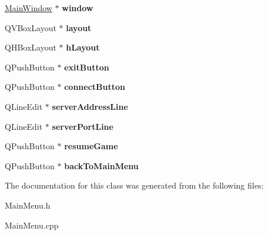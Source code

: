 \begin{DoxyCompactItemize}
\item 
\hypertarget{classMainMenu_abc19dcb3e56979d23cc48e0872022ed7}{
\hyperlink{classMainWindow}{MainWindow} $\ast$ {\bfseries window}}
\label{classMainMenu_abc19dcb3e56979d23cc48e0872022ed7}

\item 
\hypertarget{classMainMenu_a516a5fa867eb244537c9d98b20b953ab}{
QVBoxLayout $\ast$ {\bfseries layout}}
\label{classMainMenu_a516a5fa867eb244537c9d98b20b953ab}

\item 
\hypertarget{classMainMenu_a38c3e8be4f61fa8726abc836ac564531}{
QHBoxLayout $\ast$ {\bfseries hLayout}}
\label{classMainMenu_a38c3e8be4f61fa8726abc836ac564531}

\item 
\hypertarget{classMainMenu_a3ba4b0499d82456584bdefb15e2093c8}{
QPushButton $\ast$ {\bfseries exitButton}}
\label{classMainMenu_a3ba4b0499d82456584bdefb15e2093c8}

\item 
\hypertarget{classMainMenu_a5910e9a72a0d8593d54d788ae47986aa}{
QPushButton $\ast$ {\bfseries connectButton}}
\label{classMainMenu_a5910e9a72a0d8593d54d788ae47986aa}

\item 
\hypertarget{classMainMenu_ad2231d7db99457de06ef5640087e5352}{
QLineEdit $\ast$ {\bfseries serverAddressLine}}
\label{classMainMenu_ad2231d7db99457de06ef5640087e5352}

\item 
\hypertarget{classMainMenu_af5b7ab4d1ad65ea3db7a832a8c450256}{
QLineEdit $\ast$ {\bfseries serverPortLine}}
\label{classMainMenu_af5b7ab4d1ad65ea3db7a832a8c450256}

\item 
\hypertarget{classMainMenu_ad78c2a0f13183960cc760b59bd51c0b0}{
QPushButton $\ast$ {\bfseries resumeGame}}
\label{classMainMenu_ad78c2a0f13183960cc760b59bd51c0b0}

\item 
\hypertarget{classMainMenu_a4952f6caaf2f5bddfbd6d87c206f34e5}{
QPushButton $\ast$ {\bfseries backToMainMenu}}
\label{classMainMenu_a4952f6caaf2f5bddfbd6d87c206f34e5}

\end{DoxyCompactItemize}


The documentation for this class was generated from the following files:\begin{DoxyCompactItemize}
\item 
MainMenu.h\item 
MainMenu.cpp\end{DoxyCompactItemize}

